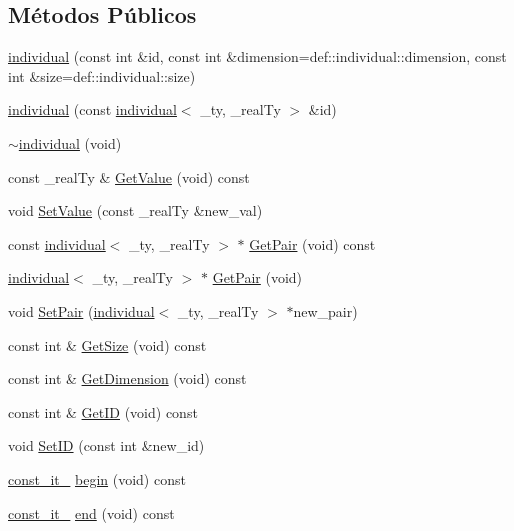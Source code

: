 \subsection*{Métodos Públicos}
\begin{DoxyCompactItemize}
\item 
\hyperlink{classindividual_af3455065daf6ab90fdb5c3e6347e453f}{individual} (const int \&id, const int \&dimension=def::individual::dimension, const int \&size=def::individual::size)
\item 
\hyperlink{classindividual_ab73b6268c2159515fc0bd845fbbbb13c}{individual} (const \hyperlink{classindividual}{individual}$<$ \_\-ty, \_\-realTy $>$ \&id)
\item 
\hyperlink{classindividual_a987acf66924e969f29e3091faf6776b3}{$\sim$individual} (void)
\item 
const \_\-realTy \& \hyperlink{classindividual_adf23ea4763b162d8e84ee53765775697}{GetValue} (void) const 
\item 
void \hyperlink{classindividual_a906863b234c66ce3a45cab44c85ef385}{SetValue} (const \_\-realTy \&new\_\-val)
\item 
const \hyperlink{classindividual}{individual}$<$ \_\-ty, \_\-realTy $>$ $\ast$ \hyperlink{classindividual_ad9f03da405f7f069cbafd11387fbf5f9}{GetPair} (void) const 
\item 
\hyperlink{classindividual}{individual}$<$ \_\-ty, \_\-realTy $>$ $\ast$ \hyperlink{classindividual_a57a124a83b28f8af06fa2e5dbcf30c55}{GetPair} (void)
\item 
void \hyperlink{classindividual_a07dd69312bd76a2046ca3331b769023d}{SetPair} (\hyperlink{classindividual}{individual}$<$ \_\-ty, \_\-realTy $>$ $\ast$new\_\-pair)
\item 
const int \& \hyperlink{classindividual_a061ed50343d97420486e74d49e38a96f}{GetSize} (void) const 
\item 
const int \& \hyperlink{classindividual_a2142383da99c87d1f2dac7fccd4565d8}{GetDimension} (void) const 
\item 
const int \& \hyperlink{classindividual_aec666131664fc884367d321cde07a586}{GetID} (void) const 
\item 
void \hyperlink{classindividual_aa9650e911651d6656cbd44f0d9344aaf}{SetID} (const int \&new\_\-id)
\item 
\hyperlink{classindividual_adcf0ed63de337fb1511eb795502f6e48}{const\_\-it\_\-} \hyperlink{classindividual_aacc10fcba3051c1b1913afe924c8f293}{begin} (void) const 
\item 
\hyperlink{classindividual_adcf0ed63de337fb1511eb795502f6e48}{const\_\-it\_\-} \hyperlink{classindividual_af2c60e6a02eae91c9f1b419a11067bdb}{end} (void) const 

\end{DoxyCompactItemize}
